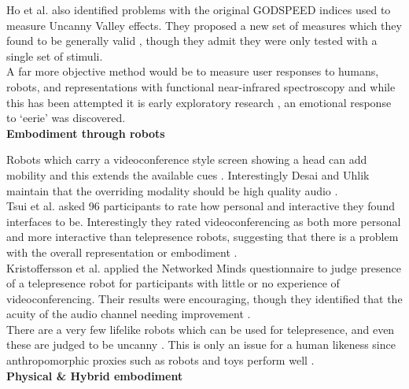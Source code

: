                     Ho et al. also identified problems with the original GODSPEED indices used to measure Uncanny Valley effects. They proposed a new set of measures which they found to be generally valid \cite{Ho:2010:RUV:1853385.1853509}, though they admit they were only tested with a single set of stimuli.\\
                    A far more objective method would be to measure user responses to humans, robots, and representations with functional near-infrared spectroscopy and while this has been attempted it is early exploratory research \cite{Strait2014}, an emotional response to `eerie' was discovered.\\
                    
\textbf{Embodiment through robots}

                    Robots which carry a videoconference style screen showing a head can add mobility and this extends the available cues \cite{Adalgeirsson2010, Lee2011b, Tsui2011, Paulos1998, Kristoffersson2013}. Interestingly Desai and Uhlik maintain that the overriding modality should be high quality audio \cite{Desai2011}.\\
                    Tsui et al. asked 96 participants to rate how personal and interactive they found interfaces to be. Interestingly they rated videoconferencing as both more personal and more interactive than telepresence robots, suggesting that there is a problem with the overall representation or embodiment \cite{Tsui2012}.\\
                    Kristoffersson et al. applied the Networked Minds questionnaire to judge presence of a telepresence robot for participants with little or no experience of videoconferencing. Their results were encouraging, though they identified that the acuity of the audio channel needing improvement \cite{Kristoffersson2011}.\\
                    There are a very few lifelike robots which can be used for telepresence, and even these are judged to be uncanny \cite{Sakamoto2007}. This is only an issue for a human likeness since anthropomorphic proxies such as robots and toys perform well \cite{Mori1970}.\\
                    
 \textbf{Physical \& Hybrid embodiment}
 
